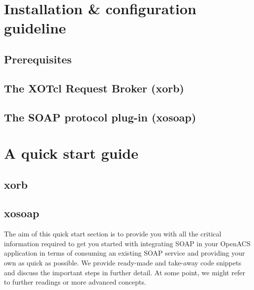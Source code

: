      \section{Installation \& configuration guideline}
     	\subsection{Prerequisites}
	\subsection{The XOTcl Request Broker (xorb)}
 
	\subsection{The SOAP protocol plug-in (xosoap)}
  \section{A quick start guide}\label{sec:quickstart}
  \subsection{xorb}\label{sec:quickstart:xorb}
  \subsection{xosoap}\label{sec:quickstart:xosoap}
  The aim of this quick start section is to provide you with all the critical information required to get you 
started with integrating SOAP in your OpenACS application in terms of consuming an existing SOAP 
service and providing your own as quick as possible. We provide ready-made and take-away code 
snippets and discuss the important steps in further detail. At some point, we might refer to further 
readings or more advanced concepts. 

